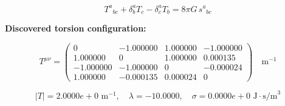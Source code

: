 
\begin{equation}
  T^a{}_{bc} + \delta^a_b T_c - \delta^a_c T_b = 8\pi G \, s^a{}_{bc}
\end{equation}

\textbf{Discovered torsion configuration:}

\begin{equation}
  T^{\mu\nu} = \begin{pmatrix}
    0 & -1.000000 & 1.000000 & -1.000000 \\
    1.000000 & 0 & 1.000000 & 0.000135 \\
    -1.000000 & -1.000000 & 0 & -0.000024 \\
    1.000000 & -0.000135 & 0.000024 & 0
  \end{pmatrix} \quad \text{m}^{-1}
\end{equation}

\begin{equation}
  |T| = 2.0000e+0 \text{ m}^{-1}, \quad
  \lambda = -10.0000, \quad
  \sigma = 0.0000e+0 \text{ J}\cdot\text{s/m}^3
\end{equation}